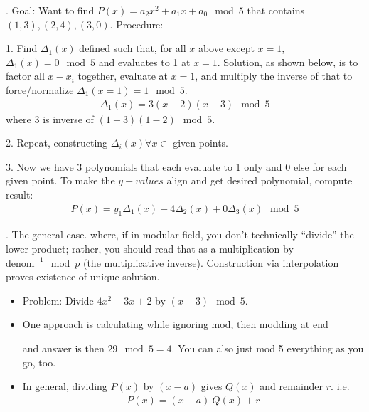 \documentclass[12pt]{article}
\newcommand{\myspace}{\vspace{2\bigskipamount}}
\newcommand\p{\Needspace{12\baselineskip} \noindent}
\begin{document}
\myspace
\p {}. Goal: Want to find $P(x) = a_2x^2 + a_1 x + a_0 \mod{5}$ that contains $(1,3), (2,4), (3,0)$. Procedure:
\begin{compactitem}
	\item[1.] Find $\Delta_1(x)$ defined such that, for all $x$ above except $x=1$, $\Delta_1(x) = 0\mod{5}$ and evaluates to 1 at $x=1$. Solution, as shown below, is to factor all $x - x_i$ together, evaluate at $x=1$, and multiply the inverse of that to force/normalize $\Delta_1(x=1) = 1\mod{5}$. 
	\begin{align}
		\Delta_1(x) = 3 (x - 2)(x - 3) \mod{5}
	\end{align} 
	where $3$ is inverse of $(1-3)(1-2) \mod{5}$. 
	\item[2.] Repeat, constructing $\Delta_i(x) \forall x \in$ given points. 
	\item[3.] Now we have $3$ polynomials that each evaluate to 1 only and 0 else for each given point. To make the $y-values$ align and get desired polynomial, compute result:
	\begin{align}
		P(x) = y_1 \Delta_1(x) + 4\Delta_2(x) + 0 \Delta_3(x) \mod{5}
	\end{align}
\end{compactitem}

\myspace
\p {}. The general case.
where, if in modular field, you don't technically ``divide'' the lower product; rather, you should read that as a multiplication by $\text{denom}^{-1} \mod{p}$ (the multiplicative inverse). Construction via interpolation proves existence of unique solution. 



\myspace
\p {}
	\begin{itemize}
		\item Problem: Divide $4x^2 - 3x + 2$ by $(x-3)\mod{5}$. 
		\item One approach is calculating while ignoring mod, then modding at end \newline
			\begin{center}  \end{center}
		and answer is then $29\mod{5} = 4$. You can also just mod 5 everything as you go, too. 
		\item In general, dividing $P(x)$ by $(x-a)$ gives $Q(x)$ and remainder $r$. i.e.
		\begin{align}
			P(x) = (x-a)~Q(x) + r
			\label{Poly}
		\end{align}
	\end{itemize}
\end{document}

